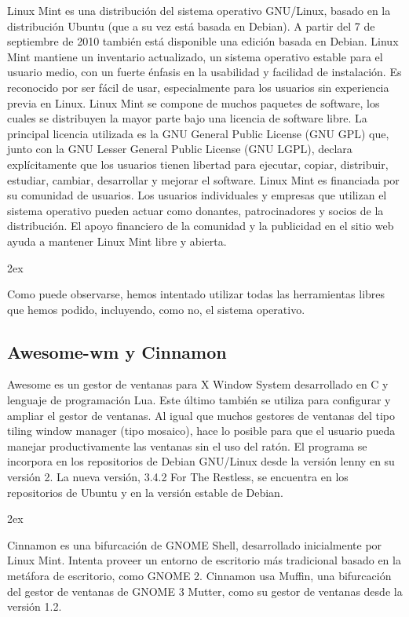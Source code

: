 \documentclass[12pt,a4paper]{report}
\begin{document}
Linux Mint es una distribución del sistema operativo GNU/Linux, basado en la
distribución Ubuntu (que a su vez está basada en Debian). A partir del 7 de
septiembre de 2010 también está disponible una edición basada en Debian.
Linux Mint mantiene un inventario actualizado, un sistema operativo estable para
el usuario medio, con un fuerte énfasis en la usabilidad y facilidad de
instalación. Es reconocido por ser fácil de usar, especialmente para los
usuarios sin experiencia previa en Linux.
Linux Mint se compone de muchos paquetes de software, los cuales se distribuyen
la mayor parte bajo una licencia de software libre. La principal licencia
utilizada es la GNU General Public License (GNU GPL) que, junto con la GNU
Lesser General Public License (GNU LGPL), declara explícitamente que los
usuarios tienen libertad para ejecutar, copiar, distribuir, estudiar, cambiar,
desarrollar y mejorar el software. Linux Mint es financiada por su comunidad de
usuarios. Los usuarios individuales y empresas que utilizan el sistema operativo
pueden actuar como donantes, patrocinadores y socios de la distribución. El
apoyo financiero de la comunidad y la publicidad en el sitio web ayuda a
mantener Linux Mint libre y abierta.

\parskip 2ex

Como puede observarse, hemos intentado utilizar todas las herramientas libres
que hemos podido, incluyendo, como no, el sistema operativo. 


\subsection{Awesome-wm y Cinnamon}

Awesome es un gestor de ventanas para X Window System desarrollado en C y
lenguaje de programación Lua. Este último también se utiliza para configurar y
ampliar el gestor de ventanas. Al igual que muchos gestores de ventanas del tipo
tiling window manager (tipo mosaico), hace lo posible para que el usuario pueda
manejar productivamente las ventanas sin el uso del ratón.
El programa se incorpora en los repositorios de Debian GNU/Linux desde la
versión lenny en su versión 2. La nueva versión, 3.4.2 For The Restless, se
encuentra en los repositorios de Ubuntu y en la versión estable de Debian.

\parskip 2ex

Cinnamon es una bifurcación de GNOME Shell, desarrollado inicialmente por Linux
Mint. Intenta proveer un entorno de escritorio más tradicional basado en la
metáfora de escritorio, como GNOME 2. Cinnamon usa Muffin, una bifurcación del
gestor de ventanas de GNOME 3 Mutter, como su gestor de ventanas desde la
versión 1.2.
\end{document}
